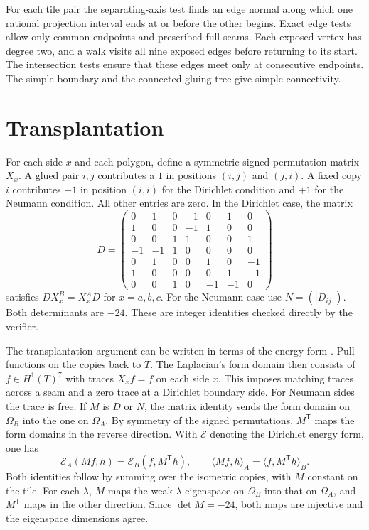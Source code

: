\documentclass[11pt]{article}
\newcommand{\twinA}{\Omega_A}
\newcommand{\twinB}{\Omega_B}
\begin{document}
For each tile pair the separating-axis test finds an edge normal along
which one rational projection interval ends at or before the other
begins. Exact edge tests allow only common endpoints and prescribed
full seams. Each exposed vertex has degree two, and a walk visits all
nine exposed edges before returning to its start. The intersection tests
ensure that these edges meet only at consecutive endpoints. The simple
boundary and the connected gluing tree give simple connectivity.

\section{Transplantation}\label{sec:transplantation}

For each side $x$ and each polygon, define a symmetric signed permutation
matrix $X_x$. A glued pair $i,j$ contributes a $1$ in positions
$(i,j)$ and $(j,i)$. A fixed copy $i$ contributes $-1$ in position
$(i,i)$ for the Dirichlet condition and $+1$ for the Neumann condition.
All other entries are zero. In the Dirichlet case, the matrix
\[
 D=\begin{pmatrix}
 0& 1&0&-1&0&1&0\\
 1& 0&0&-1&1&0&0\\
 0& 0&1& 1&0&0&1\\
-1&-1&1& 0&0&0&0\\
 0& 1&0& 0&1&0&-1\\
 1& 0&0& 0&0&1&-1\\
 0& 0&1& 0&-1&-1&0
 \end{pmatrix}
\]
satisfies $D X_x^B=X_x^A D$ for $x=a,b,c$. For the Neumann case use
$N=(|D_{ij}|)$. Both determinants are $-24$. These are integer
identities checked directly by the verifier.

The transplantation argument can be written in terms of the energy
form \cite[Sections~3 and~6]{aek}.
Pull functions on the copies back to $T$. The Laplacian's form domain
then consists of $f\in H^1(T)^7$ with traces $X_x f=f$ on each side $x$.
This imposes matching traces across a seam and a zero trace at a
Dirichlet boundary side. For Neumann sides the trace is free. If $M$ is
$D$ or $N$, the matrix identity sends the form domain on $\twinB$ into
the one on $\twinA$. By symmetry of the signed permutations,
$M^{\mathsf T}$ maps the form domains in the reverse direction. With
$\mathcal E$ denoting the Dirichlet energy form, one has
\[
 \mathcal E_A(M f,h)=\mathcal E_B(f,M^{\mathsf T}h),\qquad
 \langle M f,h\rangle_A=\langle f,M^{\mathsf T}h\rangle_B .
\]
Both identities follow by summing over the isometric copies, with
$M$ constant on the tile. For each $\lambda$, $M$ maps the weak
$\lambda$-eigenspace on $\twinB$ into that on $\twinA$, and
$M^{\mathsf T}$ maps in the other direction. Since $\det M=-24$,
both maps are injective and the eigenspace dimensions agree.
\end{document}
